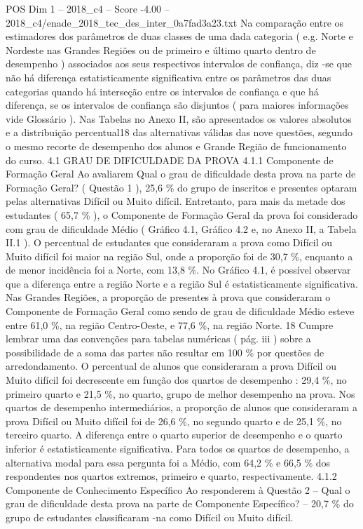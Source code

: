 \begin{textsample}{POS Dim 1 – 2018\_c4 – Score -4.00 – 2018\_c4/enade\_2018\_tec\_des\_inter\_0a7fad3a23.txt}
Na comparação entre os estimadores dos parâmetros de duas classes de uma dada categoria ( e.g.
Norte e Nordeste nas Grandes Regiões ou de primeiro e último quarto dentro de desempenho ) associados aos seus respectivos intervalos de confiança, diz -se que não há diferença estatisticamente significativa entre os parâmetros das duas categorias quando há interseção entre os intervalos de confiança e que há diferença, se os intervalos de confiança são disjuntos ( para maiores informações vide Glossário ).
Nas Tabelas no Anexo II, são apresentados os valores absolutos e a distribuição percentual18 das alternativas válidas das nove questões, segundo o mesmo recorte de desempenho dos alunos e Grande Região de funcionamento do curso. 4.1 GRAU DE DIFICULDADE DA PROVA 4.1.1 Componente de Formação Geral Ao avaliarem Qual o grau de dificuldade desta prova na parte de Formação Geral? ( Questão 1 ), 25,6 \% do grupo de inscritos e presentes optaram pelas alternativas Difícil ou Muito difícil.
Entretanto, para mais da metade dos estudantes ( 65,7 \% ), o Componente de Formação Geral da prova foi considerado com grau de dificuldade Médio ( Gráfico 4.1, Gráfico 4.2 e, no Anexo II, a Tabela II.1 ).
O percentual de estudantes que consideraram a prova como Difícil ou Muito difícil foi maior na região Sul, onde a proporção foi de 30,7 \%, enquanto a de menor incidência foi a Norte, com 13,8 \%.
No Gráfico 4.1, é possível observar que a diferença entre a região Norte e a região Sul é estatisticamente significativa.
Nas Grandes Regiões, a proporção de presentes à prova que consideraram o Componente de Formação Geral como sendo de grau de dificuldade Médio esteve entre 61,0 \%, na região Centro-Oeste, e 77,6 \%, na região Norte. 18 Cumpre lembrar uma das convenções para tabelas numéricas ( pág. iii ) sobre a possibilidade de a soma das partes não resultar em 100 \% por questões de arredondamento.
O percentual de alunos que consideraram a prova Difícil ou Muito difícil foi decrescente em função dos quartos de desempenho : 29,4 \%, no primeiro quarto e 21,5 \%, no quarto, grupo de melhor desempenho na prova.
Nos quartos de desempenho intermediários, a proporção de alunos que consideraram a prova Difícil ou Muito difícil foi de 26,6 \%, no segundo quarto e de 25,1 \%, no terceiro quarto.
A diferença entre o quarto superior de desempenho e o quarto inferior é estatisticamente significativa.
Para todos os quartos de desempenho, a alternativa modal para essa pergunta foi a Médio, com 64,2 \% e 66,5 \% dos respondentes nos quartos extremos, primeiro e quarto, respectivamente. 4.1.2 Componente de Conhecimento Específico Ao responderem à Questão 2 – Qual o grau de dificuldade desta prova na parte de Componente Específico? – 20,7 \% do grupo de estudantes classificaram -na como Difícil ou Muito difícil.

\end{textsample}
